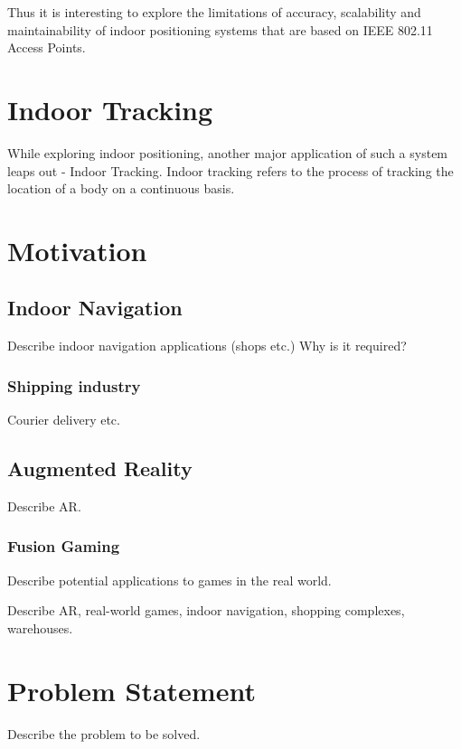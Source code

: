 Thus it is interesting to explore the limitations of accuracy, scalability and maintainability of indoor positioning systems that are based on IEEE 802.11 Access Points.


\section{Indoor Tracking}

While exploring indoor positioning, another major application of such a system leaps out - Indoor Tracking. Indoor tracking refers to the process of tracking the location of a body on a continuous basis.


\section{Motivation}

  \subsection{Indoor Navigation}

  Describe indoor navigation applications (shops etc.)
  Why is it required?

  \subsubsection{Shipping industry}
  Courier delivery etc.


  \subsection{Augmented Reality}

  Describe AR.

  \subsubsection{Fusion Gaming}

  Describe potential applications to games in the real world.

  Describe AR, real-world games, indoor navigation, shopping complexes, warehouses.


\section{Problem Statement}
  Describe the problem to be solved.